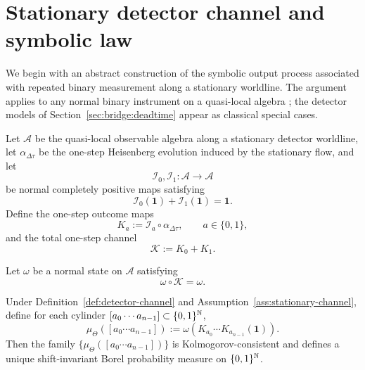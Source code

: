 \section{Stationary detector channel and symbolic law}\label{sec:bridge:operational}

We begin with an abstract construction of the symbolic output process associated with repeated binary measurement along a stationary worldline. The argument applies to any normal binary instrument on a quasi-local algebra \cite{FewsterVerch2012,Fewster2020}; the detector models of Section~\ref{sec:bridge:deadtime} appear as classical special cases.

\begin{definition}\label{def:detector-channel}
Let $\mathcal A$ be the quasi-local observable algebra along a stationary detector worldline, let $\alpha_{\Delta\tau}$ be the one-step Heisenberg evolution induced by the stationary flow, and let
\[
\mathcal I_0,\mathcal I_1:\mathcal A\to\mathcal A
\]
be normal completely positive maps satisfying
\[
\mathcal I_0(\mathbf 1)+\mathcal I_1(\mathbf 1)=\mathbf 1.
\]
Define the one-step outcome maps
\[
K_a:=\mathcal I_a\circ \alpha_{\Delta\tau},\qquad a\in\{0,1\},
\]
and the total one-step channel
\[
\mathcal K:=K_0+K_1.
\]
\end{definition}

\begin{assumption}\label{ass:stationary-channel}
Let $\omega$ be a normal state on $\mathcal A$ satisfying
\[
\omega\circ \mathcal K=\omega.
\]
\end{assumption}

\begin{theorem}\label{thm:operational-law}
Under Definition~\ref{def:detector-channel} and Assumption~\ref{ass:stationary-channel}, define for each cylinder $[a_0\cdots a_{n-1}]\subset\{0,1\}^{\mathbb{N}}$,
\begin{equation}\label{eq:bridge-cylinder-law}
\mu_\Theta([a_0\cdots a_{n-1}])
:=
\omega\!\left(
K_{a_0}\cdots K_{a_{n-1}}(\mathbf 1)
\right).
\end{equation}
Then the family $\{\mu_\Theta([a_0\cdots a_{n-1}])\}$ is Kolmogorov-consistent and defines a unique shift-invariant Borel probability measure on $\{0,1\}^{\mathbb{N}}$.
\end{theorem}

